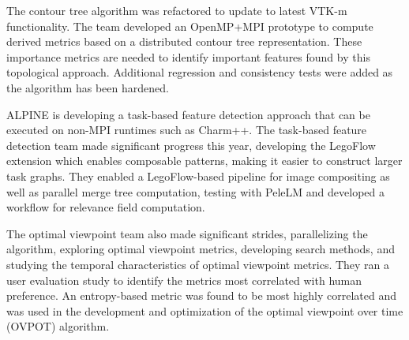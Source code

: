 

The contour tree algorithm was refactored to update to latest VTK-m functionality.   The team developed an OpenMP+MPI prototype to compute derived metrics based on a distributed contour tree representation.  These importance metrics are needed to identify important features found by this topological approach.  Additional regression and consistency tests were added as the algorithm has been hardened.  

ALPINE is developing a task-based feature detection approach that can be executed on non-MPI runtimes such as Charm++.  The task-based feature detection team made significant progress this year, developing the LegoFlow extension which enables composable patterns, making it easier to construct larger task graphs.   They enabled a LegoFlow-based pipeline for image compositing as well as parallel merge tree computation, testing with PeleLM and developed a workflow for relevance field computation.


The optimal viewpoint team also made significant strides, parallelizing the algorithm, exploring optimal viewpoint metrics, developing search methods, and studying the temporal characteristics of optimal viewpoint metrics.  They ran a user evaluation study to identify the metrics most correlated with human preference.  An entropy-based metric was found to be most highly correlated and was used in the development and optimization of the optimal viewpoint over time (OVPOT) algorithm.  

